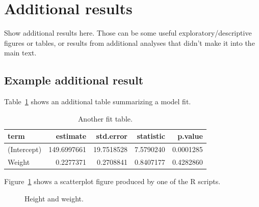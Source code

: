 \documentclass[
  letterpaper,
  DIV=11,
  numbers=noendperiod]{scrartcl}
\begin{document}
\newpage{}

\section{Additional results}\label{additional-results}

Show additional results here. Those can be some useful
exploratory/descriptive figures or tables, or results from additional
analyses that didn't make it into the main text.

\subsection{Example additional result}\label{example-additional-result}

Table~\ref{tbl-resulttable1} shows an additional table summarizing a
model fit.

\begin{longtable}[]{@{}lrrrr@{}}

\caption{\label{tbl-resulttable1}Another fit table.}

\tabularnewline

\toprule\noalign{}
term & estimate & std.error & statistic & p.value \\
\midrule\noalign{}
\endhead
\bottomrule\noalign{}
\endlastfoot
(Intercept) & 149.6997661 & 19.7518528 & 7.5790240 & 0.0001285 \\
Weight & 0.2277371 & 0.2708841 & 0.8407177 & 0.4282860 \\

\end{longtable}

Figure~\ref{fig-result2} shows a scatterplot figure produced by one of
the R scripts.

\begin{figure}


\caption{\label{fig-result2}Height and weight.}

\end{figure}%
\end{document}
